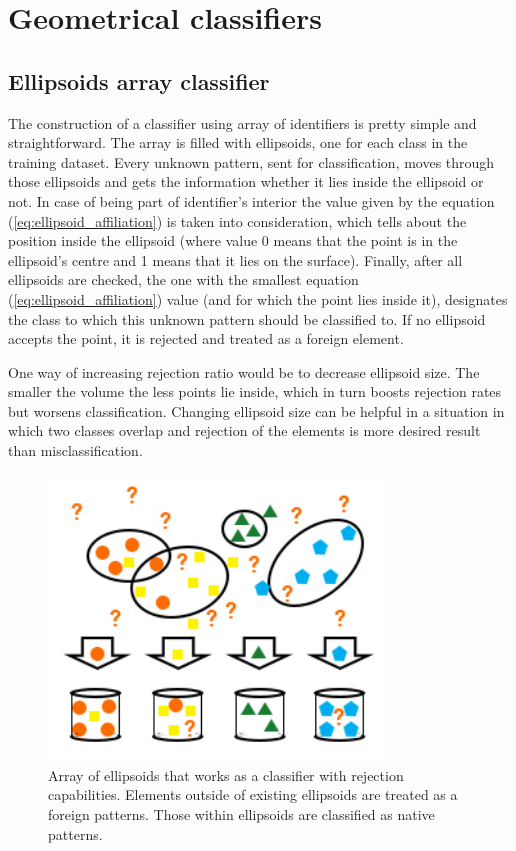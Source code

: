 \section{Geometrical classifiers}

\subsection{Ellipsoids array classifier}

The construction of a classifier using array of identifiers is pretty simple and straightforward. The array is filled with ellipsoids, one for each class in the training dataset. Every unknown pattern, sent for classification, moves through those ellipsoids and gets the information whether it lies inside the ellipsoid or not. In case of being part of identifier's interior the value given by the equation (\ref{eq:ellipsoid_affiliation}) is taken into consideration, which tells about the position inside the ellipsoid (where value 0 means that the point is in the ellipsoid's centre and 1 means that it lies on the surface). Finally, after all ellipsoids are checked, the one with the smallest equation (\ref{eq:ellipsoid_affiliation}) value (and for which the point lies inside it), designates the class to which this unknown pattern should be classified to. If no ellipsoid accepts the point, it is rejected and treated as a foreign element. 

One way of increasing rejection ratio would be to decrease ellipsoid size. The smaller the volume the less points lie inside, which in turn boosts rejection rates but worsens classification. Changing ellipsoid size can be helpful in a situation in which two classes overlap and rejection of the elements is more desired result than misclassification.

\begin{figure}[htp]
	\centering
	\includegraphics[width=0.8\textwidth]{Figures/ellipsoid_classification.jpg}
	\caption{ Array of ellipsoids that works as a classifier with rejection capabilities. Elements outside of existing ellipsoids are treated as a foreign patterns. Those within ellipsoids are classified as native patterns. }
	\label{fig:ellipsoids_array}\vspace{-3pt}
\end{figure}

